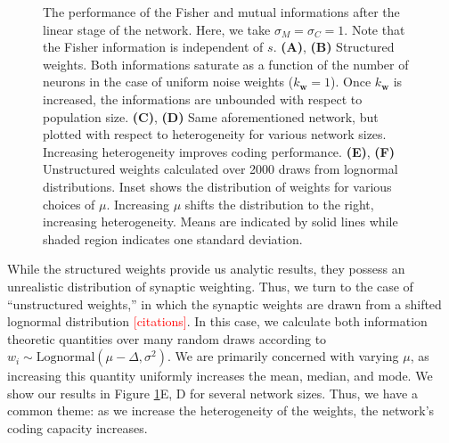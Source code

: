 \documentclass[11pt]{article}
\begin{document}
\begin{figure}[t]
		\caption{The performance of the Fisher and mutual informations after the linear stage of the network. Here, we take $\sigma_M = \sigma_C=1$. Note that the Fisher information is independent of $s$. \textbf{(A)}, \textbf{(B)} Structured weights. Both informations saturate as a function of the number of neurons in the case of uniform noise weights ($k_{\mathbf{w}}=1$). Once $k_{\mathbf{w}}$ is increased, the informations are unbounded with respect to population size. \textbf{(C)}, \textbf{(D)} Same aforementioned network, but plotted with respect to heterogeneity for various network sizes. Increasing heterogeneity improves coding performance. \textbf{(E)}, \textbf{(F)} Unstructured weights calculated over 2000 draws from lognormal distributions. Inset shows the distribution of weights for various choices of $\mu$. Increasing $\mu$ shifts the distribution to the right, increasing heterogeneity. Means are indicated by solid lines while shaded region indicates one standard deviation.} 
		\label{fig:struct-linear}
	\end{figure}
	
	While the structured weights provide us analytic results, they possess an unrealistic distribution of synaptic weighting. Thus, we turn to the case of ``unstructured weights,'' in which the synaptic weights are drawn from a shifted lognormal distribution \textcolor{red}{[citations]}. In this case, we calculate both information theoretic quantities over many random draws according to $w_i \sim \text{Lognormal}(\mu - \Delta, \sigma^2)$. We are primarily concerned with varying $\mu$, as increasing this quantity uniformly increases the mean, median, and mode. We show our results in Figure \ref{fig:struct-linear}E, D for several network sizes. Thus, we have a common theme: as we increase the heterogeneity of the weights, the network's coding capacity increases.
\end{document}
